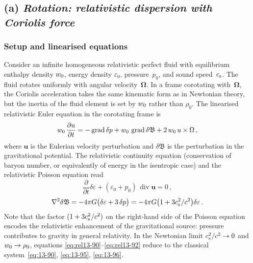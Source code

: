 \subsection*{(a) \textit{Rotation: relativistic dispersion with Coriolis
  force}}
\label{subsec:rel-120a}

\subsubsection*{Setup and linearised equations}

Consider an infinite homogeneous relativistic perfect fluid with
equilibrium enthalpy density $w_{0}$, energy density
$\varepsilon_{0}$, pressure~$p_{0}$, and sound speed~$c_{\mathrm{s}}$.  The fluid
rotates uniformly with angular velocity~$\boldsymbol{\Omega}$.  In a
frame corotating with~$\boldsymbol{\Omega}$, the Coriolis acceleration
takes the same kinematic form as in Newtonian theory, but the inertia
of the fluid element is set by $w_{0}$ rather than $\rho_{0}$.
The linearised relativistic Euler equation in the corotating frame is
\begin{equation}
  w_{0}\,\frac{\partial u}{\partial t}
  = -\operatorname{grad}\delta p
    + w_{0}\,\operatorname{grad}\delta\mathfrak{B}
    + 2\,w_{0}\,u\times\Omega\,,
  \label{eq:rel13-90}
\end{equation}
where $\mathbf{u}$ is the Eulerian velocity perturbation and
$\delta\mathfrak{B}$ is the perturbation in the gravitational
potential.  The relativistic continuity equation (conservation of
baryon number, or equivalently of energy in the isentropic case) and the
relativistic Poisson equation read
\begin{equation}
  \frac{\partial}{\partial t}\delta\varepsilon
  + (\varepsilon_{0}+p_{0})\,\operatorname{div}\mathbf{u} = 0\,,
  \label{eq:rel13-91}
\end{equation}
\begin{equation}
  \nabla^{2}\delta\mathfrak{B}
  = -4\pi G\bigl(\delta\varepsilon + 3\,\delta p\bigr)
  = -4\pi G\bigl(1 + 3c_{\mathrm{s}}^{2}/c^{2}\bigr)\delta\varepsilon\,.
  \label{eq:rel13-92}
\end{equation}
Note that the factor $(1 + 3c_{\mathrm{s}}^{2}/c^{2})$ on the right-hand side of
the Poisson equation encodes the relativistic enhancement of the
gravitational source: pressure contributes to gravity in general
relativity.  In the Newtonian limit $c_{\mathrm{s}}^{2}/c^{2}\to 0$ and
$w_{0}\to\rho_{0}$, equations
\eqref{eq:rel13-90}--\eqref{eq:rel13-92} reduce to the classical
system~\eqref{eq:13-90}, \eqref{eq:13-95}, \eqref{eq:13-96}.

